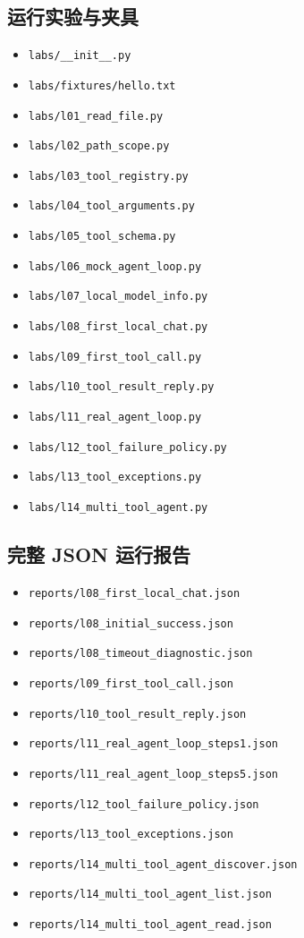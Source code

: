 \documentclass[UTF8,zihao=-4,fontset=fandol]{ctexart}
\begin{document}
\subsection{运行实验与夹具}
\begin{itemize}
\item \nolinkurl{labs/__init__.py}
\item \nolinkurl{labs/fixtures/hello.txt}
\item \nolinkurl{labs/l01_read_file.py}
\item \nolinkurl{labs/l02_path_scope.py}
\item \nolinkurl{labs/l03_tool_registry.py}
\item \nolinkurl{labs/l04_tool_arguments.py}
\item \nolinkurl{labs/l05_tool_schema.py}
\item \nolinkurl{labs/l06_mock_agent_loop.py}
\item \nolinkurl{labs/l07_local_model_info.py}
\item \nolinkurl{labs/l08_first_local_chat.py}
\item \nolinkurl{labs/l09_first_tool_call.py}
\item \nolinkurl{labs/l10_tool_result_reply.py}
\item \nolinkurl{labs/l11_real_agent_loop.py}
\item \nolinkurl{labs/l12_tool_failure_policy.py}
\item \nolinkurl{labs/l13_tool_exceptions.py}
\item \nolinkurl{labs/l14_multi_tool_agent.py}
\end{itemize}

\subsection{完整 JSON 运行报告}
\begin{itemize}
\item \nolinkurl{reports/l08_first_local_chat.json}
\item \nolinkurl{reports/l08_initial_success.json}
\item \nolinkurl{reports/l08_timeout_diagnostic.json}
\item \nolinkurl{reports/l09_first_tool_call.json}
\item \nolinkurl{reports/l10_tool_result_reply.json}
\item \nolinkurl{reports/l11_real_agent_loop_steps1.json}
\item \nolinkurl{reports/l11_real_agent_loop_steps5.json}
\item \nolinkurl{reports/l12_tool_failure_policy.json}
\item \nolinkurl{reports/l13_tool_exceptions.json}
\item \nolinkurl{reports/l14_multi_tool_agent_discover.json}
\item \nolinkurl{reports/l14_multi_tool_agent_list.json}
\item \nolinkurl{reports/l14_multi_tool_agent_read.json}
\end{itemize}
\end{document}
